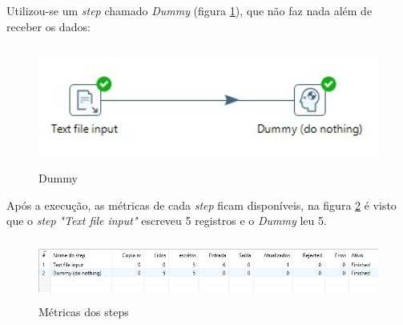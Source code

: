 Utilizou-se um \textit{step} chamado \textit{Dummy} (figura \ref{dummy}), que não faz nada além de receber os dados:
\begin{figure}[H]
\centering
\includegraphics[height=4cm]{imagens/example1.png}
\caption{Dummy}
\label{dummy}
\end{figure}
Após a execução, as métricas de cada \textit{step} ficam disponíveis, na figura \ref{metrics} é visto que o \textit{step} \textit{"Text file input" }escreveu 5 registros e o \textit{Dummy} leu 5.
\begin{figure}[H]
\centering
\includegraphics[height=2cm]{imagens/metrics.png}
\caption{Métricas dos steps}
\label{metrics}
\end{figure}
\vfill
